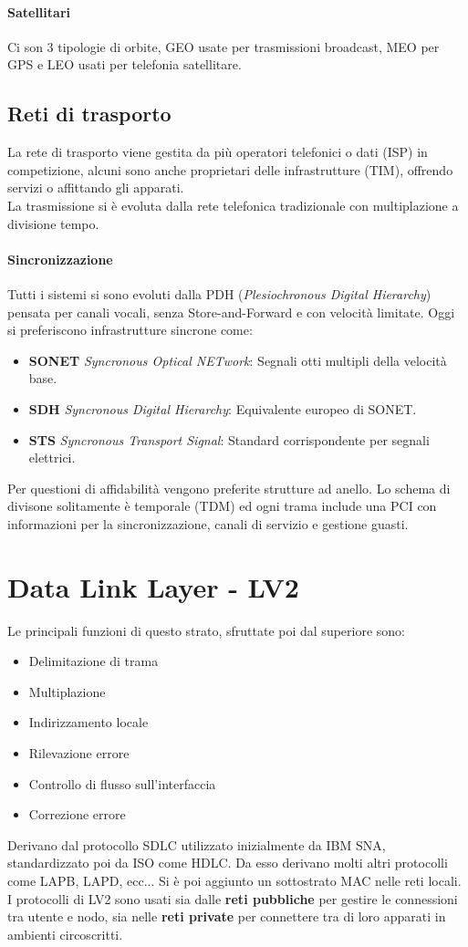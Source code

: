 \documentclass[12pt]{article}
\begin{document}
\paragraph{Satellitari}
Ci son 3 tipologie di orbite, GEO usate per trasmissioni broadcast, MEO per GPS e LEO usati per telefonia satellitare.

\subsection{Reti di trasporto}
La rete di trasporto viene gestita da più operatori telefonici o dati (ISP) in competizione, alcuni sono anche proprietari delle infrastrutture (TIM), offrendo servizi o affittando gli apparati.\\
La trasmissione si è evoluta dalla rete telefonica tradizionale con multiplazione a divisione tempo.
\paragraph{Sincronizzazione}
Tutti i sistemi si sono evoluti dalla PDH (\textit{Plesiochronous Digital Hierarchy}) pensata per canali vocali, senza Store-and-Forward e con velocità limitate. Oggi si preferiscono infrastrutture sincrone come:
\begin{itemize}
  \item \textbf{SONET} \textit{Syncronous Optical NETwork}: Segnali otti multipli della velocità base.
  \item \textbf{SDH} \textit{Syncronous Digital Hierarchy}: Equivalente europeo di SONET.
  \item \textbf{STS} \textit{Syncronous Transport Signal}: Standard corrispondente per segnali elettrici.
\end{itemize}
Per questioni di affidabilità vengono preferite strutture ad anello. Lo schema di divisone solitamente è temporale (TDM) ed ogni trama include una PCI con informazioni per la sincronizzazione, canali di servizio e gestione guasti.

\section{Data Link Layer - LV2} \label{LV2}
Le principali funzioni di questo strato, sfruttate poi dal superiore sono:
\begin{itemize}
  \item Delimitazione di trama
  \item Multiplazione
  \item Indirizzamento locale
  \item Rilevazione errore
  \item Controllo di flusso sull'interfaccia
  \item Correzione errore
\end{itemize}
Derivano dal protocollo SDLC utilizzato inizialmente da IBM SNA, standardizzato poi da ISO come HDLC. Da esso derivano molti altri protocolli come LAPB, LAPD, ecc... Si è poi aggiunto un sottostrato MAC nelle reti locali.\\
I protocolli di LV2 sono usati sia dalle \textbf{reti pubbliche} per gestire le connessioni tra utente e nodo, sia nelle \textbf{reti private} per connettere tra di loro apparati in ambienti circoscritti.
\end{document}
